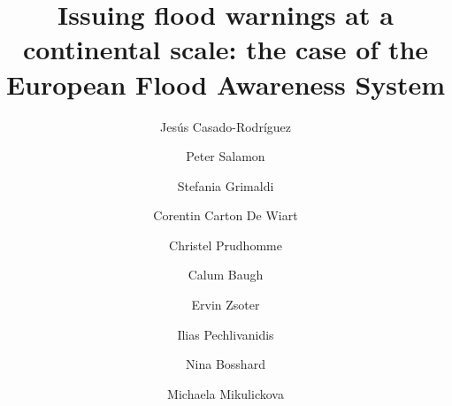 \documentclass[preprint,12pt]{elsarticle}
\begin{document}
\begin{frontmatter}



\title{Issuing flood warnings at a continental scale: the case of the European Flood Awareness System}


\author[inst1]{Jesús Casado-Rodríguez}
\author[inst1]{Peter Salamon}
\author[inst2]{Stefania Grimaldi}
\author[inst2]{Corentin Carton De Wiart}
\author[inst2]{Christel Prudhomme}
\author[inst2]{Calum Baugh}
\author[inst2]{Ervin Zsoter}
\author[inst3]{Ilias Pechlivanidis}
\author[inst3]{Nina Bosshard}
\author[inst4]{Michaela Mikulickova}




\end{frontmatter}
\end{document}
